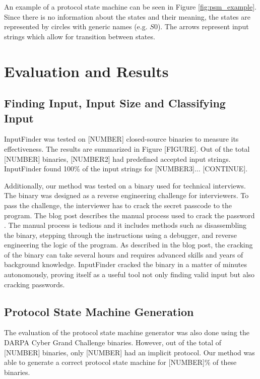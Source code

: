 \documentclass{acm_proc_article-sp}
\def \tool {InputFinder}
\begin{document}
An example of a protocol state machine can be seen in Figure \ref{fig:psm_example}.
Since there is no information about the states and their meaning, the states are represented by circles with generic names (e.g. $S0$).
The arrows represent input strings which allow for transition between states.

\section{Evaluation and Results} \label{results}
\subsection{Finding Input, Input Size and Classifying Input}
\tool{} was tested on [NUMBER] closed-source binaries to measure its effectiveness.
The results are summarized in Figure [FIGURE].
Out of the total [NUMBER] binaries, [NUMBER2] had predefined accepted input strings.
\tool{} found 100\% of the input strings for [NUMBER3]...
[CONTINUE].


Additionally, our method was tested on a binary used for technical interviews.
The binary was designed as a reverse engineering challenge for interviewers.
To pass the challenge, the interviewer has to crack the secret passcode to the program.
The blog post describes the manual process used to crack the password \cite{interviewbinary}.
The manual process is tedious and it includes methods such as disassembling the binary, stepping through the instructions using a debugger, and reverse engineering the logic of the program.
As described in the blog post, the cracking of the binary can take several hours and requires advanced skills and years of background knowledge.
\tool{} cracked the binary in a matter of minutes autonomously, proving itself as a useful tool not only finding valid input but also cracking passwords.

\subsection{Protocol State Machine Generation}
The evaluation of the protocol state machine generator was also done using the DARPA Cyber Grand Challenge binaries.
However, out of the total of [NUMBER] binaries, only [NUMBER] had an implicit protocol.
Our method was able to generate a correct protocol state machine for [NUMBER]\% of these binaries.
\end{document}
